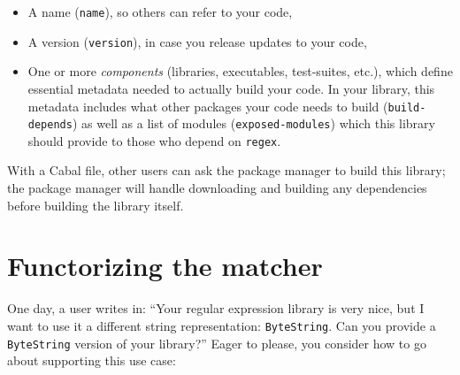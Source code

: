 \begin{itemize}
    \item A name (\verb|name|), so others can refer to your code,
    \item A version (\verb|version|), in case you release updates
    to your code,
    \item One or more \emph{components} (libraries, executables,
    test-suites, etc.), which define essential metadata needed
    to actually build your code.  In your library, this metadata
    includes what other packages your code needs to build
    (\verb|build-depends|) as well as a list of modules
    (\verb|exposed-modules|) which this library should provide
    to those who depend on \verb|regex|.
\end{itemize}
%
With a Cabal file, other users can ask the package manager to build this
library; the package manager will handle downloading and building any dependencies
before building the library itself.


\section{Functorizing the matcher}
\label{sec:functorizing-the-matcher}

One day,
a user writes in: ``Your regular expression library is very nice,
but I want to use it a different string representation: \verb|ByteString|.
Can you provide a \verb|ByteString| version of your library?''
Eager to please, you consider how to go about supporting this use
case:

